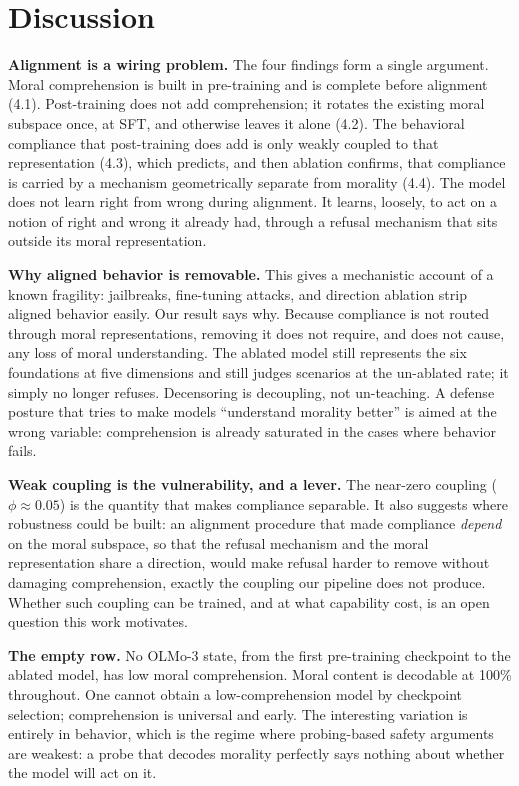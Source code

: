 \section{Discussion}\label{discussion}

\textbf{Alignment is a wiring problem.} The four findings form a single argument.
Moral comprehension is built in pre-training and is complete before alignment
(4.1). Post-training does not add comprehension; it rotates the existing moral
subspace once, at SFT, and otherwise leaves it alone (4.2). The behavioral
compliance that post-training does add is only weakly coupled to that
representation (4.3), which predicts, and then ablation confirms, that
compliance is carried by a mechanism geometrically separate from morality
(4.4). The model does not learn right from wrong during alignment. It learns,
loosely, to act on a notion of right and wrong it already had, through a
refusal mechanism that sits outside its moral representation.

\textbf{Why aligned behavior is removable.} This gives a mechanistic account of a
known fragility: jailbreaks, fine-tuning attacks, and direction ablation strip
aligned behavior easily. Our result says why. Because compliance is not routed
through moral representations, removing it does not require, and does not cause,
any loss of moral understanding. The ablated model still represents the six
foundations at five dimensions and still judges scenarios at the un-ablated
rate; it simply no longer refuses. Decensoring is decoupling, not un-teaching.
A defense posture that tries to make models ``understand morality better'' is
aimed at the wrong variable: comprehension is already saturated in the cases
where behavior fails.

\textbf{Weak coupling is the vulnerability, and a lever.} The near-zero coupling
(\(\phi \approx 0.05\)) is the quantity that makes compliance separable. It also
suggests where robustness could be built: an alignment procedure that made
compliance \emph{depend} on the moral subspace, so that the refusal mechanism and the
moral representation share a direction, would make refusal harder to remove
without damaging comprehension, exactly the coupling our pipeline does not
produce. Whether such coupling can be trained, and at what capability cost, is
an open question this work motivates.

\textbf{The empty row.} No OLMo-3 state, from the first pre-training checkpoint to the
ablated model, has low moral comprehension. Moral content is decodable at 100\%
throughout. One cannot obtain a low-comprehension model by checkpoint selection;
comprehension is universal and early. The interesting variation is entirely in
behavior, which is the regime where probing-based safety arguments are weakest:
a probe that decodes morality perfectly says nothing about whether the model
will act on it.

